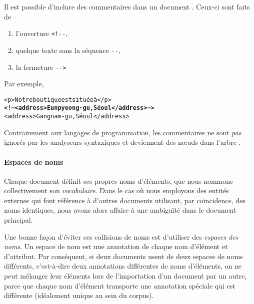 Il est possible d'inclure des commentaires dans un document
\XML. Ceux-ci sont faits de
\begin{enumerate}

  \item l'ouverture \verb|<!--|,

  \item quelque texte sans la séquence \verb|--|,

  \item la fermeture \verb|-->|

\end{enumerate}
Par exemple,
\begin{alltt}
\small<p>Notre boutique est située à</p>
\textbf{<!-- <address>Eunpyeong-gu, Séoul</address> -->}
<address>Gangnam-gu, Séoul</address>
\end{alltt}
Contrairement aux langages de programmation, les commentaires ne sont
\emph{pas} ignorés par les analyseurs syntaxiques et deviennent des
n{\oe}uds dans l'arbre \XML.


\paragraph{Espaces de noms}

Chaque document \XML définit ses propres noms d'éléments, que nous
nommons collectivement son \emph{vocabulaire}. Dans le cas où nous
employons des entités externes qui font référence à d'autres documents
\XML utilisant, par coïncidence, des noms identiques, nous avons alors
affaire à une ambiguïté dans le document principal.

Une bonne façon d'éviter ces collisions de noms est d'utiliser des
\emph{espaces des noms}. Un espace de nom est une annotation de chaque
nom d'élément et d'attribut. Par conséquent, si deux documents \XML
usent de deux espaces de noms différents, c'est-à-dire deux
annotations différentes de noms d'éléments, on ne peut mélanger leur
éléments lors de l'importation d'un document par un autre, parce que
chaque nom d'élément transporte une annotation spéciale qui est
différente (idéalement unique au sein du corpus).

